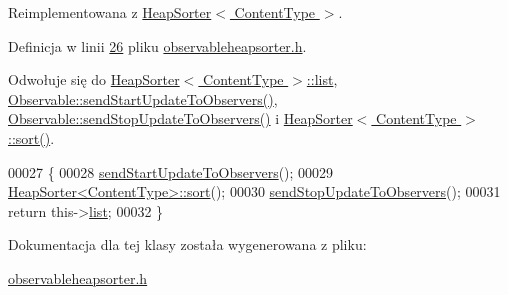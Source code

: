 Reimplementowana z \hyperlink{class_heap_sorter_a0617d40d6d46a65535e7af76f2957898}{Heap\-Sorter$<$ Content\-Type $>$}.



Definicja w linii \hyperlink{observableheapsorter_8h_source_l00026}{26} pliku \hyperlink{observableheapsorter_8h_source}{observableheapsorter.\-h}.



Odwołuje się do \hyperlink{heapsorter_8h_source_l00021}{Heap\-Sorter$<$ Content\-Type $>$\-::list}, \hyperlink{observable_8h_source_l00029}{Observable\-::send\-Start\-Update\-To\-Observers()}, \hyperlink{observable_8h_source_l00039}{Observable\-::send\-Stop\-Update\-To\-Observers()} i \hyperlink{heapsorter_8h_source_l00042}{Heap\-Sorter$<$ Content\-Type $>$\-::sort()}.


\begin{DoxyCode}
00027         \{
00028                 \hyperlink{class_observable_a78df64057f152342a43f27979186a6ba}{sendStartUpdateToObservers}();
00029                 \hyperlink{class_heap_sorter_a0617d40d6d46a65535e7af76f2957898}{HeapSorter<ContentType>::sort}();
00030                 \hyperlink{class_observable_a16f75ed1514a0cb7526b5a5d2b7ca7c6}{sendStopUpdateToObservers}();
00031                 \textcolor{keywordflow}{return} this->\hyperlink{class_heap_sorter_ae5061b641a597893a2e7f747c9cc15f2}{list};
00032         \}
\end{DoxyCode}


Dokumentacja dla tej klasy została wygenerowana z pliku\-:\begin{DoxyCompactItemize}
\item 
\hyperlink{observableheapsorter_8h}{observableheapsorter.\-h}\end{DoxyCompactItemize}
